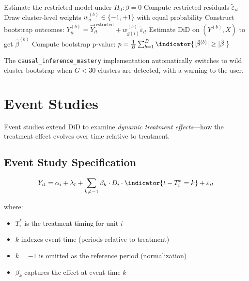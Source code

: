 \begin{algorithm}[H]
\caption{Wild Cluster Bootstrap for DiD}
\begin{algorithmic}[1]
\STATE Estimate the restricted model under $H_0: \beta = 0$
\STATE Compute restricted residuals $\tilde{\varepsilon}_{it}$
    \STATE Draw cluster-level weights $w_g^{(b)} \in \{-1, +1\}$ with equal probability
    \STATE Construct bootstrap outcomes: $Y_{it}^{(b)} = \hat{Y}_{it}^{\text{restricted}} + w_{g(i)}^{(b)} \tilde{\varepsilon}_{it}$
    \STATE Estimate DiD on $(Y^{(b)}, X)$ to get $\hat{\beta}^{(b)}$
\ENDFOR
\STATE Compute bootstrap p-value: $p = \frac{1}{B} \sum_{b=1}^{B} \indicator{|\hat{\beta}^{(b)}| \geq |\hat{\beta}|}$
\end{algorithmic}
\end{algorithm}

\begin{remark}
The \texttt{causal\_inference\_mastery} implementation automatically switches to wild cluster bootstrap when $G < 30$ clusters are detected, with a warning to the user.
\end{remark}

\section{Event Studies}
\label{sec:did_event}

Event studies extend DiD to examine \emph{dynamic treatment effects}---how the treatment effect evolves over time relative to treatment.

\subsection{Event Study Specification}

\begin{equation}
Y_{it} = \alpha_i + \lambda_t + \sum_{k \neq -1} \beta_k \cdot D_i \cdot \indicator{t - T_i^* = k} + \varepsilon_{it}
\label{eq:event_study}
\end{equation}

where:
\begin{itemize}
    \item $T_i^*$ is the treatment timing for unit $i$
    \item $k$ indexes event time (periods relative to treatment)
    \item $k = -1$ is omitted as the reference period (normalization)
    \item $\beta_k$ captures the effect at event time $k$
\end{itemize}

